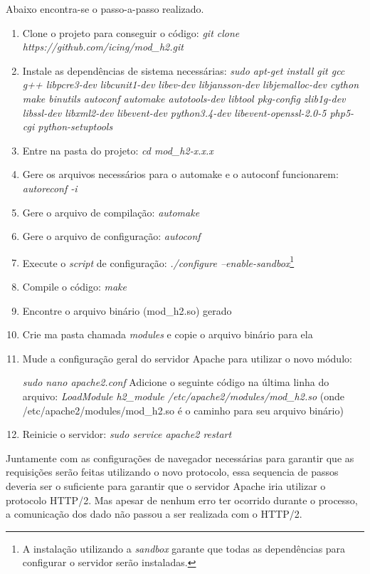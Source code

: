 \begin{apendicesenv}
Abaixo encontra-se o passo-a-passo realizado.

\begin{enumerate}
	\item Clone o projeto para conseguir o código: \textit{git clone https://github.com/icing/mod\_h2.git}
	\item Instale as dependências de sistema necessárias: \textit{sudo apt-get install git gcc g++ libpcre3-dev libcunit1-dev libev-dev libjansson-dev libjemalloc-dev cython make binutils autoconf automake autotools-dev libtool pkg-config zlib1g-dev libssl-dev libxml2-dev libevent-dev python3.4-dev libevent-openssl-2.0-5 php5-cgi python-setuptools}
	\item Entre na pasta do projeto: \textit{cd mod\_h2-x.x.x}
	\item Gere os arquivos necessários para o automake e o autoconf funcionarem: \textit{autoreconf -i}
	\item Gere o arquivo de compilação: \textit{automake}
	\item Gere o arquivo de configuração: \textit{autoconf}
	\item Execute o \textit{script} de configuração: \textit{./configure --enable-sandbox}\footnote{A instalação utilizando a \textit{sandbox} garante que todas as dependências para configurar o servidor serão instaladas.}
	\item Compile o código: \textit{make}
	\item Encontre o arquivo binário (mod\_h2.so) gerado
	\item Crie ma pasta chamada \textit{modules} e copie o arquivo binário para ela
	\item Mude a configuração geral do servidor Apache para utilizar o novo módulo:
		\begin{center}
			\textit{sudo nano apache2.conf}
			Adicione o seguinte código na última linha do arquivo: \textit{LoadModule h2\_module /etc/apache2/modules/mod\_h2.so} (onde /etc/apache2/modules/mod\_h2.so é o caminho para seu arquivo binário)
		\end{center}
	\item Reinicie o servidor: \textit{sudo service apache2 restart}
\end{enumerate}

Juntamente com as configurações de navegador necessárias para garantir que as requisições serão feitas utilizando o novo protocolo, essa sequencia de passos deveria ser o suficiente para garantir que o servidor Apache iria utilizar o protocolo HTTP/2. Mas apesar de nenhum erro ter ocorrido durante o processo, a comunicação dos dado não passou a ser realizada com o HTTP/2.


\end{apendicesenv}
